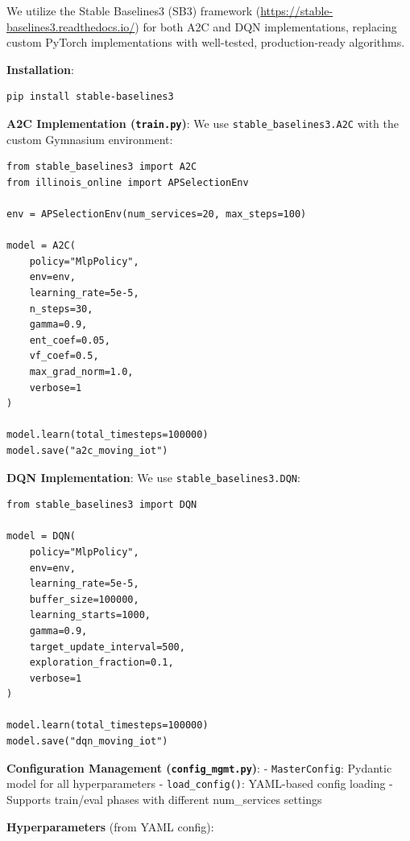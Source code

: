 \documentclass[10pt,twocolumn]{article}
\begin{document}
We utilize the Stable Baselines3 (SB3) framework
(\url{https://stable-baselines3.readthedocs.io/}) for both A2C and DQN
implementations, replacing custom PyTorch implementations with
well-tested, production-ready algorithms.

\textbf{Installation}:

\begin{verbatim}
pip install stable-baselines3
\end{verbatim}

\textbf{A2C Implementation (\texttt{train.py})}: We use
\texttt{stable\_baselines3.A2C} with the custom Gymnasium environment:

\begin{verbatim}
from stable_baselines3 import A2C
from illinois_online import APSelectionEnv

env = APSelectionEnv(num_services=20, max_steps=100)

model = A2C(
    policy="MlpPolicy",
    env=env,
    learning_rate=5e-5,
    n_steps=30,
    gamma=0.9,
    ent_coef=0.05,
    vf_coef=0.5,
    max_grad_norm=1.0,
    verbose=1
)

model.learn(total_timesteps=100000)
model.save("a2c_moving_iot")
\end{verbatim}

\textbf{DQN Implementation}: We use \texttt{stable\_baselines3.DQN}:

\begin{verbatim}
from stable_baselines3 import DQN

model = DQN(
    policy="MlpPolicy",
    env=env,
    learning_rate=5e-5,
    buffer_size=100000,
    learning_starts=1000,
    gamma=0.9,
    target_update_interval=500,
    exploration_fraction=0.1,
    verbose=1
)

model.learn(total_timesteps=100000)
model.save("dqn_moving_iot")
\end{verbatim}

\textbf{Configuration Management (\texttt{config\_mgmt.py})}: -
\texttt{MasterConfig}: Pydantic model for all hyperparameters -
\texttt{load\_config()}: YAML-based config loading - Supports train/eval
phases with different num\_services settings

\textbf{Hyperparameters} (from YAML config):
\end{document}

